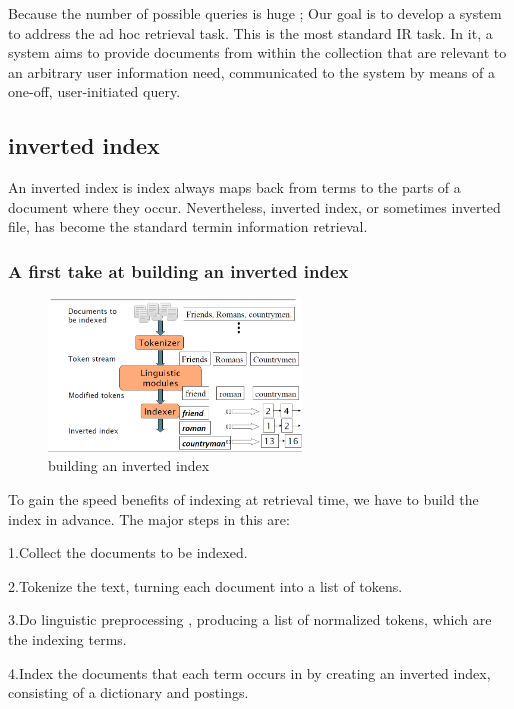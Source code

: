 Because the number of possible queries is huge ; Our goal is to develop a system to address the ad hoc retrieval task. This is the most standard IR task. In it, a system aims to provide documents from within the collection that are relevant to an arbitrary user information need, communicated to the system by means of a one-off, user-initiated query.


\subsection{inverted index}

An inverted index is index always maps back from terms to the parts of a document where they occur. Nevertheless, inverted index, or sometimes inverted file, has become the standard termin information retrieval.
 
\subsubsection{A first take at building an inverted index}

\begin{figure}[H]%
    \center%
    \includegraphics[width=0.6\textwidth]{images/shimaa/building an inverted index.png}
    \caption[building an inverted index]{building an inverted index}\label{fig:building an inverted index}%
\end{figure}
 
To gain the speed benefits of indexing at retrieval time, we have to build the
index in advance. The major steps in this are:

1.Collect the documents to be indexed.

2.Tokenize the text, turning each document into a list of tokens.

3.Do linguistic preprocessing , producing a list of normalized tokens, which
  are the indexing terms.
  
4.Index the documents that each term occurs in by creating an inverted index,
  consisting of a dictionary and postings.

